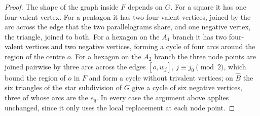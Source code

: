 \begin{proof}
The shape of the graph inside $F$ depends on $G$. For a square it has one four-valent vertex. For a pentagon it has two
four-valent vertices, joined by the arc across the edge that the two parallelograms share, and one negative vertex, the
triangle, joined to both. For a hexagon on the $A_1$ branch it has two four-valent vertices and two negative vertices,
forming a cycle of four arcs around the region of the centre $o$. For a hexagon on the $A_2$ branch the three node points are
joined pairwise by three arcs across the edges $[o,w_j]$, $j\equiv j_0\pmod 2$, which bound the region of $o$ in $F$ and form a
cycle without trivalent vertices; on $\widehat B$ the six triangles of the star subdivision of $G$ give a cycle of six negative
vertices, three of whose arcs are the $e_q$. In every case the argument above applies unchanged, since it only uses the local
replacement at each node point.


\end{proof}
